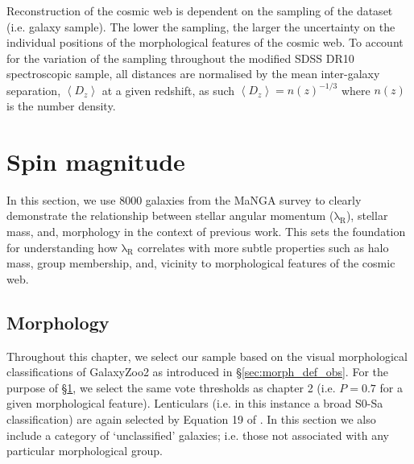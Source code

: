 Reconstruction of the cosmic web is dependent on the sampling of the dataset (i.e. galaxy sample). The lower the sampling, the larger the uncertainty on the individual positions of the morphological features of the cosmic web. To account for the variation of the sampling throughout the modified SDSS DR10 spectroscopic sample, all distances are normalised by the mean inter-galaxy separation, $\left\langle D_z \right\rangle$ at a given redshift, as such $\left\langle D_z \right\rangle = n(z)^{-1/3}$ where $n(z)$ is the number density. 

\section{Spin magnitude} \label{sec:spin_magnitude}
In this section, we use 8000 galaxies from the MaNGA survey to clearly demonstrate the relationship between stellar angular momentum ($\mathrm{\lambda_R}$), stellar mass, and, morphology in the context of previous work. This sets the foundation for understanding how $\mathrm{\lambda_R}$ correlates with more subtle properties such as halo mass, group membership, and, vicinity to morphological features of the cosmic web.

\subsection{Morphology}
Throughout this chapter, we select our sample based on the visual morphological classifications of GalaxyZoo2 \citep[GZ2][]{willett2013} as introduced in \S\ref{sec:morph_def_obs}. For the purpose of \S\ref{sec:spin_magnitude}, we select the same vote thresholds as chapter 2 (i.e. $P = 0.7$ for a given morphological feature). Lenticulars (i.e. in this instance a broad S0-Sa classification) are again selected by Equation 19 of \citet{willett2013}. In this section we also include a category of `unclassified' galaxies; i.e. those not associated with any particular morphological group.


